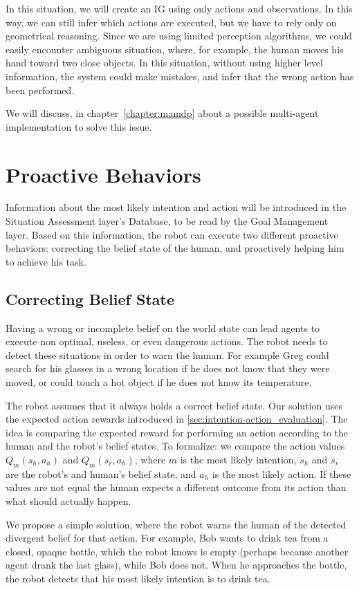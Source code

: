 In this situation, we will create an IG using only actions and observations. In this way, we can still infer which actions are executed, but we have to rely only on geometrical reasoning. Since we are using limited perception algorithms, we could easily encounter ambiguous situation, where, for example, the human moves his hand toward two close objects. In this situation, without using higher level information, the system could make mistakes, and infer that the wrong action has been performed.

We will discuss, in chapter~\ref{chapter:mamdp} about a possible multi-agent implementation to solve this issue.

\section{Proactive Behaviors}
\label{subsec:intention-proactive_behaviors}
Information about the most likely intention and action will be introduced in the Situation Assessment layer's Database, to be read by the Goal Management layer. Based on this information, the robot can execute two different proactive behaviors: correcting the belief state of the human, and proactively helping him to achieve his task.

\subsection{Correcting Belief State}
Having a wrong or incomplete belief on the world state can lead agents to execute non optimal, useless, or even dangerous actions. The robot needs to detect these situations in order to warn the human. For example Greg could search for his glasses in a wrong location if he does not know that they were moved, or could touch a hot object if he does not know its temperature.

 The robot assumes that it always holds a correct belief state. Our solution uses the expected action rewards introduced in \ref{sec:intention-action_evaluation}. The idea is comparing the expected reward for performing an action according to the human and the robot's belief states. To formalize: we compare the action values \(Q_m(s_h,a_h)\) and \(Q_m(s_r,a_h)\), where $m$ is the most likely intention,  $s_h$ and $s_r$ are the robot's and human's belief state, and $a_h$ is the most likely action. If these values are not equal the human expects a different outcome from its action than what should actually happen. 

We propose a simple solution, where the robot warns the human of the detected divergent belief for that action. For example, Bob wants to drink tea from a closed, opaque bottle, which the robot knows is empty (perhaps because another agent drank the last glass), while Bob does not. When he approaches the bottle, the robot detects that his most likely intention is to drink tea. 

